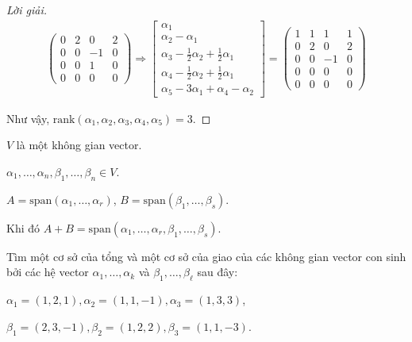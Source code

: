 \documentclass[class=linearalgebra,crop=false]{standalone}
\begin{document}
\begin{proof}[Lời giải]
\begin{align*}
\begin{pmatrix}
            0 & 2 & 0 & 2 \\
            0 & 0 & -1 & 0 \\
            0 & 0 & 1 & 0 \\
            0 & 0 & 0 & 0
        \end{pmatrix}
        \Longrightarrow
        \begin{bmatrix}
            \alpha_{1} \\
            \alpha_{2}-\alpha_{1} \\
            \alpha_{3}-\frac{1}{2}\alpha_{2}+\frac{1}{2}\alpha_{1} \\
            \alpha_{4} - \frac{1}{2}\alpha_{2} + \frac{1}{2}\alpha_{1} \\
            \alpha_{5} - 3\alpha_{1} + \alpha_{4} - \alpha_{2}
        \end{bmatrix}=
        \begin{pmatrix}
            1 & 1 & 1 & 1 \\
            0 & 2 & 0 & 2 \\
            0 & 0 & -1 & 0 \\
            0 & 0 & 0 & 0 \\
            0 & 0 & 0 & 0
        \end{pmatrix}
    \end{align*}
    \par Như vậy, $\text{rank}(\alpha_{1},\alpha_{2},\alpha_{3},\alpha_{4},\alpha_{5}) = 3$.
\end{proof}


\begin{lemma}
    $V$ là một không gian vector.
    \par $\alpha_{1},\ldots,\alpha_{n},\beta_{1},\ldots,\beta_{n}\in V$.
    \par $A = \text{span}(\alpha_{1},\ldots,\alpha_{r})$, $B = \text{span}(\beta_{1},\ldots,\beta_{s})$.
    \par Khi đó $A + B = \text{span}(\alpha_{1},\ldots,\alpha_{r},\beta_{1},\ldots,\beta_{s})$.
\end{lemma}

\par Tìm một cơ sở của tổng và một cơ sở của giao của các không gian vector con sinh bởi các hệ vector $\alpha_{1},\ldots,\alpha_{k}$ và $\beta_{1},\ldots,\beta_{\ell}$ sau đây:

\begin{exercise}$\alpha_{1} = (1,2,1), \alpha_{2} = (1,1,-1), \alpha_{3} = (1,3,3)$,
    \par $\beta_{1} = (2,3,-1), \beta_{2} = (1,2,2), \beta_{3} = (1,1,-3)$.
\end{exercise}
\end{document}
